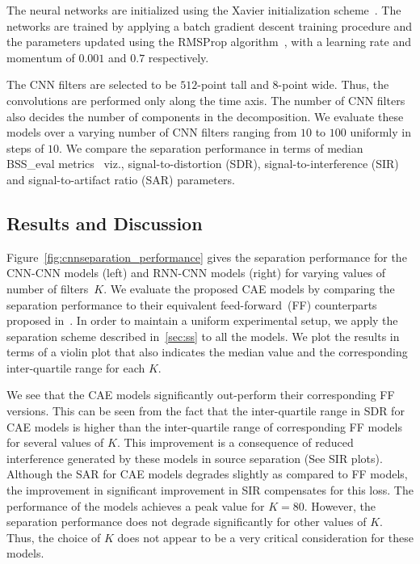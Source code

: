 \documentclass{article}
\begin{document}
The neural networks are initialized using the Xavier initialization scheme~\cite{glorot2010understanding}. The networks are trained by applying a batch gradient descent training procedure and the parameters updated using the RMSProp algorithm~\cite{tieleman2012rmsprop}, with a learning rate and momentum of $0.001$ and $0.7$ respectively.

The CNN filters are selected to be $512$-point tall and $8$-point wide. Thus, the convolutions are performed only along the time axis. The number of CNN filters also decides the number of components in the decomposition. We evaluate these models over a varying number of CNN filters ranging from $10$ to $100$ uniformly in steps of $10$. We compare the separation performance in terms of median BSS\_eval metrics~\cite{fevotte2005bss_eval} viz., signal-to-distortion (SDR), signal-to-interference (SIR) and signal-to-artifact ratio (SAR) parameters.

\subsection{Results and Discussion}
\label{subsec:results}
Figure~\ref{fig:cnnseparation_performance} gives the separation performance for the CNN-CNN models (left) and RNN-CNN models (right) for varying values of number of filters~$K$. We evaluate the proposed CAE models by comparing the separation performance to their equivalent feed-forward~(FF) counterparts proposed in~\cite{smaragdis2017aneural}. In order to maintain a uniform experimental setup, we apply the separation scheme described in~\ref{sec:ss} to all the models. We plot the results in terms of a violin plot that also indicates the median value and the corresponding inter-quartile range for each $K$.

We see that the CAE models significantly out-perform their corresponding FF versions. This can be seen from the fact that the inter-quartile range in SDR for CAE models is higher than the inter-quartile range of corresponding FF models for several values of $K$. This improvement is a consequence of reduced interference generated by these models in source separation (See SIR plots). Although the SAR for CAE models degrades slightly as compared to FF models, the improvement in significant improvement in SIR compensates for this loss. The performance of the models achieves a peak value for $K=80$. However, the separation performance does not degrade significantly for other values of $K$. Thus, the choice of $K$ does not appear to be a very critical consideration for these models.
\end{document}
